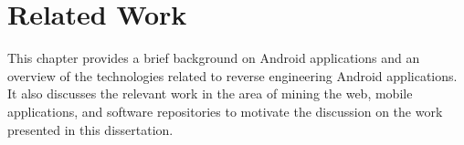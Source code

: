 \chapter{Related Work}
\label{ch:related_work_chapter}
This chapter provides a brief background on Android applications and an overview of the technologies related to reverse engineering Android applications.
It also discusses the relevant work in the area of mining the web, mobile applications, and software repositories to motivate the discussion on the work presented in this dissertation.











